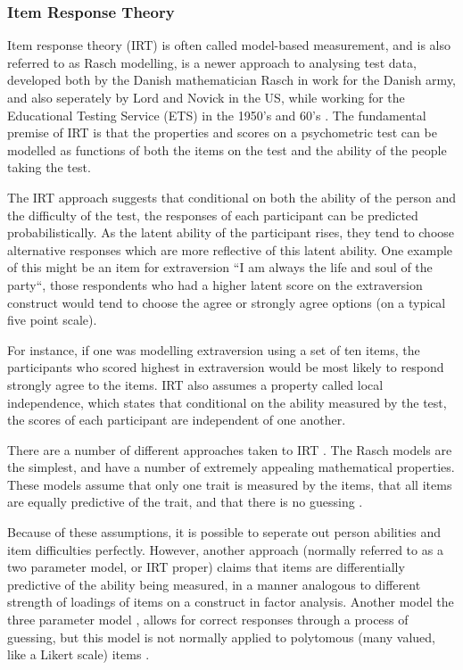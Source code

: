 \subsubsection{Item Response Theory}
\label{sec:item-response-theory}
Item response theory (IRT) is often called model-based measurement\cite{fischer1995rasch}, and is also referred to as Rasch modelling, is a newer approach to analysing test data, developed both by the Danish mathematician Rasch in work for the Danish army, and also seperately by Lord and Novick in the US, while working for the Educational Testing Service (ETS) in the 1950's and 60's \cite{van1997handbook}.
The fundamental premise of IRT is that the properties and scores on a psychometric test can be modelled as functions of both the items on the test and the ability of the people taking the test.

The IRT approach suggests that conditional on both the ability of the person and the difficulty of the test, the responses of each participant can be predicted probabilistically. As the latent ability of the participant rises, they tend to choose alternative responses which are more reflective of this latent ability. One example of this might be an item for extraversion ``I am always the life and soul of the party``, those respondents who had a higher latent score on the extraversion construct would tend to choose the agree or strongly agree options (on a typical five point scale). 

For instance, if one was modelling extraversion using a set of ten items, the participants who scored highest in extraversion would be most likely to respond strongly agree to the items.  IRT also assumes a property called local independence, which states that conditional on the ability measured by the test, the scores of each participant are independent of one another.

There are a number of different approaches taken to IRT \cite{van1997handbook,fischer1995rasch}. The  Rasch models are the simplest, and have a number of extremely appealing mathematical properties. These models assume that only one trait is measured by the items, that all items are equally predictive of the trait, and that there is no guessing \cite{van1997handbook}.

Because of these assumptions, it is possible to seperate out person abilities and item difficulties perfectly. However, another approach (normally referred to as a two parameter model, or IRT proper) claims that items are differentially predictive of the ability being measured, in a manner analogous to different strength of loadings of items on a construct in factor analysis. Another model the three parameter model \cite{lord1968statistical}, allows for correct responses through a process of guessing, but this model is not normally applied to polytomous (many valued, like a Likert scale) items \cite{van1997handbook,Mair2010}.

